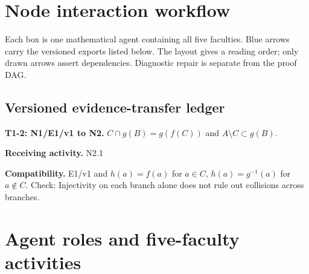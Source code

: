 \documentclass[preprint,12pt,aps,pra,showkeys,amsmath,amssymb,superscriptaddress,floatfix]{revtex4-2}
\theoremstyle{definition}
\theoremstyle{remark}
\newcommand{\field}[2]{\par\smallskip\noindent\textbf{#1.} #2\par}
\begin{document}
\clearpage\section{Node interaction workflow}

\begin{center}\end{center}

Each box is one mathematical agent containing all five faculties. Blue
arrows carry the versioned exports listed below. The layout gives a
reading order; only drawn arrows assert dependencies. Diagnostic repair
is separate from the proof DAG.

\subsection{Versioned evidence-transfer ledger}

\begingroup\small\linespread{1.05}\selectfont

\field{T1-2: N1/E1/v1 to N2}{\(C\cap g(B)=g(f(C))\) and \(A\setminus C\subset g(B)\).}

\field{Receiving activity}{N2.1}

\field{Compatibility}{E1/v1 and \(h(a)=f(a)\) for \(a\in C\), \(h(a)=g^{-1}(a)\) for
\(a\notin C\). Check: Injectivity on each branch alone does not rule out
collisions across branches.}

\endgroup

\clearpage\section{Agent roles and five-faculty activities}\begingroup\small\linespread{1.05}\selectfont{}
\end{document}
